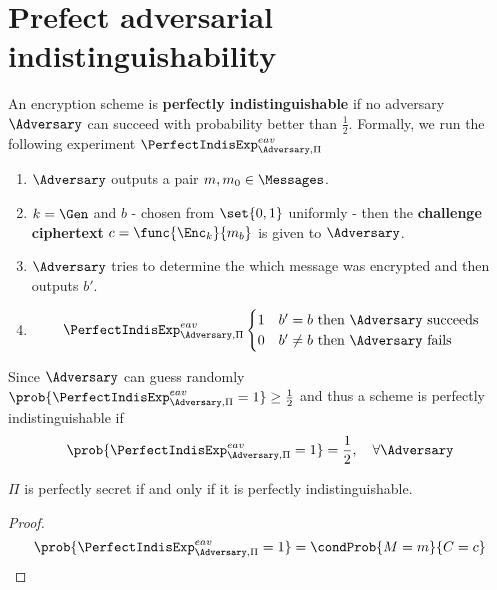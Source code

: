  \section{Prefect adversarial indistinguishability}
 An encryption scheme is \textbf{perfectly indistinguishable} if no adversary \(\Adversary\) can succeed with probability better than \(\frac{1}{2}\). Formally, we run the following experiment \(\PerfectIndisExp_{\Adversary, \Pi}^{eav}\)
 \begin{enumerate}
     \item \(\Adversary\) outputs a pair \(m,m_0 \in \Messages\).
     \item \(k = \Gen\) and \(b\) - chosen from \(\set{0,1}\) uniformly - then the \textbf{challenge ciphertext} \(c = \func{\Enc_k}{m_b}\) is given to \(\Adversary\).
     \item \(\Adversary\) tries to determine the which message was encrypted and then outputs \(b'\).
     \item 
     \begin{equation*}
        \PerfectIndisExp_{\Adversary, \Pi}^{eav}
         \begin{cases}
            1 & b' = b \ \text{then}\  \Adversary \ \text{succeeds}\\
            0 & b' \neq b \  \text{then}\  \Adversary \ \text{fails}
         \end{cases}
     \end{equation*}
 \end{enumerate}

 Since \(\Adversary\) can guess randomly \(\prob{\PerfectIndisExp_{\Adversary, \Pi}^{eav} = 1} \geq \frac{1}{2}\) and thus a scheme is perfectly indistinguishable if 
 \begin{equation*}
    \prob{\PerfectIndisExp_{\Adversary, \Pi}^{eav} = 1}  = \frac{1}{2}, \quad \forall \Adversary
 \end{equation*}

 \begin{proposition}
     \(\Pi\) is perfectly secret if and only if it is perfectly indistinguishable.
 \end{proposition}

 \begin{proof}
    \begin{equation*}
    \prob{\PerfectIndisExp_{\Adversary, \Pi}^{eav} = 1}  = \condProb{M = m }{C = c}
    \end{equation*}
 \end{proof}

